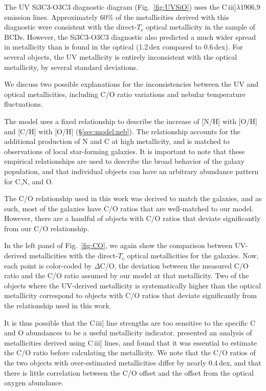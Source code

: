 \documentclass[preprint2]{aastex62}
\newcommand{\ciii}{C\,{\sc iii}]\xspace}
\newcommand{\Te}{\ensuremath{T_{\mathrm{e}}}\xspace}
\begin{document}
The UV Si3C3-O3C3 diagnostic diagram (Fig.~\ref{fig:UVSiO}) uses the \ciii$\lambda$1906,9 emission lines. Approximately 60\% of the metallicities derived with this diagnostic were consistent with the direct-\Te optical metallicity in the \citet{Berg+2016} sample of BCDs. However, the Si3C3-O3C3 diagnostic also predicted a much wider spread in metallicity than is found in the optical (1.2\,dex compared to 0.6\,dex). For several objects, the UV metallicity is entirely inconsistent with the optical metallicity, by several standard deviations.

We discuss two possible explanations for the inconsistencies between the UV and optical metallicities, including C/O ratio variations and nebular temperature fluctuations.

The \citet{Byler+2018} model uses a fixed relationship to describe the increase of [N/H] with [O/H] and [C/H] with [O/H] (\S\ref{sec:model:neb}). The relationship accounts for the additional production of N and C at high metallicity, and is matched to observations of local star-forming galaxies. It is important to note that these empirical relationships are used to describe the broad behavior of the galaxy population, and that individual objects can have an arbitrary abundance pattern for C,N, and O.

The C/O relationship used in this work was derived to match the \citet{Berg+2016} galaxies, and as such, most of the \citet{Berg+2016} galaxies have C/O ratios that are well-matched to our model. However, there are a handful of objects with C/O ratios that deviate significantly from our C/O relationship.

In the left panel of Fig.~\ref{fig:CO}, we again show the comparison between UV-derived metallicities with the direct-\Te optical metallicities for the \citet{Berg+2016} galaxies. Now, each point is color-coded by $\Delta$C/O, the deviation between the measured C/O ratio and the C/O ratio assumed by our model at that metallicity. Two of the objects where the UV-derived metallicity is systematically higher than the optical metallicity correspond to objects with C/O ratios that deviate significantly from the relationship used in this work.

It is thus possible that the \ciii line strengths are too sensitive to the specific C and O abundances to be a useful metallicity indicator. \citet{PerezMontero+2017} presented an analysis of metallicities derived using \ciii lines, and found that it was essential to estimate the C/O ratio before calculating the metallicity. We note that the C/O ratios of the two objects with over-estimated metallicities differ by nearly 0.4\,dex, and that there is little correlation between the C/O offset and the offset from the optical oxygen abundance.
\end{document}
